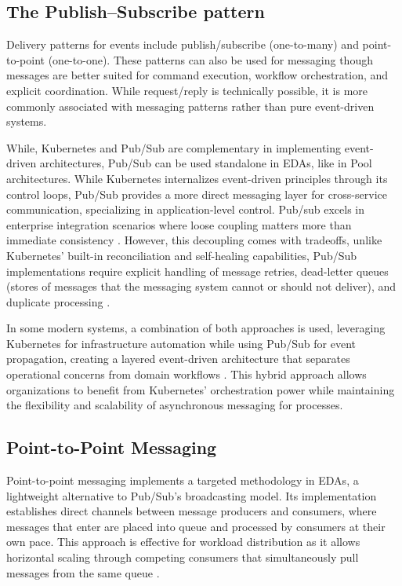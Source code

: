 \documentclass[]{final}
\begin{document}
\subsection{The Publish–Subscribe pattern}

Delivery patterns for events include publish/subscribe (one-to-many) and
point-to-point (one-to-one). These patterns can also be used for messaging
though messages are better suited for command execution, workflow
orchestration, and explicit coordination. While request/reply is technically
possible, it is more commonly associated with messaging patterns rather than
pure event-driven systems.

While, Kubernetes and Pub/Sub are complementary in implementing event-driven
architectures, Pub/Sub can be used standalone in EDAs, like in Pool
architectures. While Kubernetes internalizes event-driven principles through
its control loops, Pub/Sub provides a more direct messaging layer for
cross-service communication, specializing in application-level control.
Pub/sub excels in enterprise integration scenarios where loose coupling
matters more than immediate consistency \cite{noauthor_what_pubsub}. However, this decoupling comes
with tradeoffs, unlike Kubernetes' built-in reconciliation and self-healing
capabilities, Pub/Sub implementations require explicit handling of message
retries, dead-letter queues (stores of messages that the messaging system
cannot or should not deliver), and duplicate processing \cite{noauthor_what_pubsub}.

In some modern systems, a combination of both approaches is used, leveraging
Kubernetes for infrastructure automation while using Pub/Sub for event
propagation, creating a layered event-driven architecture that separates
operational concerns from domain workflows \cite{noauthor_what_pubsub}. This hybrid approach allows
organizations to benefit from Kubernetes' orchestration power while
maintaining the flexibility and scalability of asynchronous messaging for
processes.

\subsection{Point-to-Point Messaging}

Point-to-point messaging implements a targeted methodology in EDAs, a
lightweight alternative to Pub/Sub's broadcasting model. Its implementation
establishes direct channels between message producers and consumers, where
messages that enter are placed into queue and processed by consumers at
their own pace. This approach is effective for workload distribution as it
allows horizontal scaling through competing consumers that simultaneously
pull messages from the same queue \cite{noauthor_point--point_nodate}.
\end{document}
